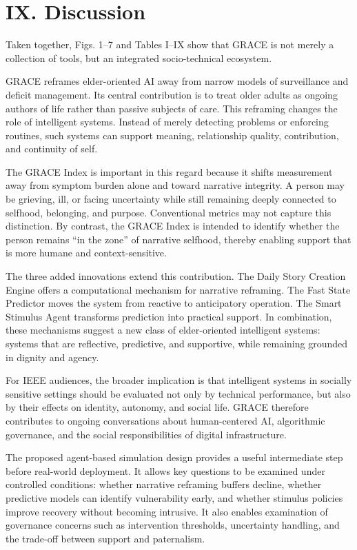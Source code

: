 \documentclass[
  journal,
]{IEEEtran}%
\begin{document}
\section{IX. Discussion}\label{ix.-discussion}

Taken together, Figs. 1--7 and Tables I--IX show that GRACE is not
merely a collection of tools, but an integrated socio-technical
ecosystem.

GRACE reframes elder-oriented AI away from narrow models of surveillance
and deficit management. Its central contribution is to treat older
adults as ongoing authors of life rather than passive subjects of care.
This reframing changes the role of intelligent systems. Instead of
merely detecting problems or enforcing routines, such systems can
support meaning, relationship quality, contribution, and continuity of
self.

The GRACE Index is important in this regard because it shifts
measurement away from symptom burden alone and toward narrative
integrity. A person may be grieving, ill, or facing uncertainty while
still remaining deeply connected to selfhood, belonging, and purpose.
Conventional metrics may not capture this distinction. By contrast, the
GRACE Index is intended to identify whether the person remains ``in the
zone'' of narrative selfhood, thereby enabling support that is more
humane and context-sensitive.

The three added innovations extend this contribution. The Daily Story
Creation Engine offers a computational mechanism for narrative
reframing. The Fast State Predictor moves the system from reactive to
anticipatory operation. The Smart Stimulus Agent transforms prediction
into practical support. In combination, these mechanisms suggest a new
class of elder-oriented intelligent systems: systems that are
reflective, predictive, and supportive, while remaining grounded in
dignity and agency.

For IEEE audiences, the broader implication is that intelligent systems
in socially sensitive settings should be evaluated not only by technical
performance, but also by their effects on identity, autonomy, and social
life. GRACE therefore contributes to ongoing conversations about
human-centered AI, algorithmic governance, and the social
responsibilities of digital infrastructure.

The proposed agent-based simulation design provides a useful
intermediate step before real-world deployment. It allows key questions
to be examined under controlled conditions: whether narrative reframing
buffers decline, whether predictive models can identify vulnerability
early, and whether stimulus policies improve recovery without becoming
intrusive. It also enables examination of governance concerns such as
intervention thresholds, uncertainty handling, and the trade-off between
support and paternalism.
\end{document}
